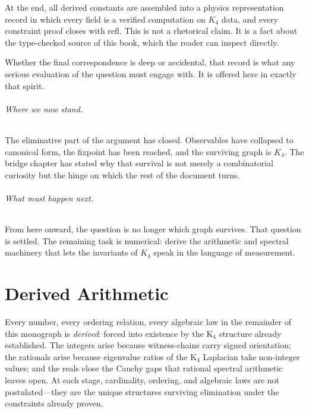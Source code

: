 \documentclass[11pt,a4paper]{book}
\def\texttt#1{#1}%
\begin{document}
At the end, all derived constants are assembled into a physics representation record
in which every field is a verified computation on $K_4$ data, and every constraint
proof closes with \texttt{refl}. This is not a rhetorical claim. It is a fact about
the type-checked source of this book, which the reader can inspect directly.

Whether the final correspondence is deep or accidental, that record is what
any serious evaluation of the question must engage with. It is offered here in
exactly that spirit.

\paragraph{Where we now stand.}
The eliminative part of the argument has closed. Observables have collapsed to canonical form, the fixpoint has been reached, and the surviving graph is $K_4$. The bridge chapter has stated why that survival is not merely a combinatorial curiosity but the hinge on which the rest of the document turns.

\paragraph{What must happen next.}
From here onward, the question is no longer which graph survives. That question is settled. The remaining task is numerical: derive the arithmetic and spectral machinery that lets the invariants of $K_4$ speak in the language of measurement.

\part{Derived Arithmetic}

Every number, every ordering relation, every algebraic law in the remainder of this
monograph is \emph{derived}: forced into existence by the K$_4$ structure already
established. The integers arise because witness-chains carry signed orientation;
the rationals arise because eigenvalue ratios of the K$_4$ Laplacian take non-integer
values; and the reals close the Cauchy gaps that rational spectral arithmetic leaves open.
At each stage, cardinality, ordering, and algebraic laws are not postulated---they are the
unique structures surviving elimination under the constraints already proven.
\end{document}
